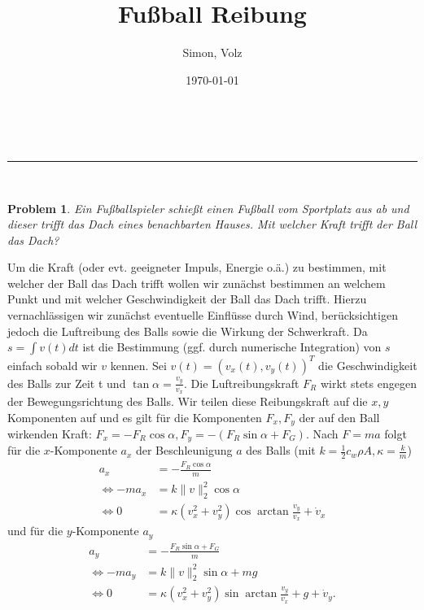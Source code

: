 \documentclass[a4paper,11pt]{article}
\makeatletter
\newcommand{\linia}{\rule{\linewidth}{0.5pt}}
\theoremstyle{mytheor}
\newtheorem{problem}{Problem}
\renewcommand{\maketitle}{
\begin{center}
\vspace{2ex}
{\huge \textsc{\@title}}
\vspace{1ex}
\\
\linia\\
\@author \hfill \@date
\vspace{4ex}
\end{center}
}
\newcommand{\norm}[1]{\|{#1}\|_2}
\makeatother
\begin{document}
\title{Fußball Reibung}

\author{Simon, Volz}

\date{\today}

\maketitle

\begin{problem}
Ein Fußballspieler schießt einen Fußball vom Sportplatz aus ab und dieser trifft das Dach eines benachbarten Hauses. Mit welcher Kraft trifft der Ball das Dach?
\end{problem}

Um die Kraft (oder evt. geeigneter Impuls, Energie o.ä.) zu bestimmen, mit welcher der Ball das Dach trifft wollen wir zunächst bestimmen an welchem Punkt und mit welcher Geschwindigkeit der Ball das Dach trifft. Hierzu vernachlässigen wir zunächst eventuelle Einflüsse durch Wind, berücksichtigen jedoch die Luftreibung des Balls sowie die Wirkung der Schwerkraft. Da $s = \int v(t) dt$ ist die Bestimmung (ggf. durch numerische Integration) von $s$ einfach sobald wir $v$ kennen.
Sei $v(t) =(v_x(t), v_y(t))^T$ die Geschwindigkeit des Balls zur Zeit t und $\tan \alpha = \frac{v_y}{v_x}$. Die Luftreibungskraft $F_R$ wirkt stets engegen der Bewegungsrichtung des Balls. Wir teilen diese Reibungskraft auf die $x,y$ Komponenten auf und es gilt für die Komponenten $F_x, F_y$ der auf den Ball wirkenden Kraft: $F_x = -F_R \cos \alpha, F_y = -(F_R \sin \alpha + F_G)$. Nach $F=ma$ folgt
für die $x$-Komponente $a_x$ der Beschleunigung $a$ des Balls (mit $k=\frac{1}{2}c_w \rho A, \kappa=\frac{k}{m}$)
\begin{align*}
    a_x        & = -\frac{F_R \cos \alpha}{m}                                      \\
    \iff -ma_x & = k \norm{v}^2 \cos \alpha                                        \\
    \iff 0     & = \kappa (v_x^2 + v_y^2) \cos \arctan \frac{v_y}{v_x} + \dot{v}_x
\end{align*}
und für die $y$-Komponente $a_y$
\begin{align*}
    a_y        & = -\frac{F_R \sin \alpha + F_G}{m}                                     \\
    \iff -ma_y & = k \norm{v}^2 \sin \alpha + m g                                       \\
    \iff 0     & = \kappa (v_x^2 + v_y^2) \sin \arctan \frac{v_y}{v_x} + g + \dot{v}_y.
\end{align*}
\end{document}
